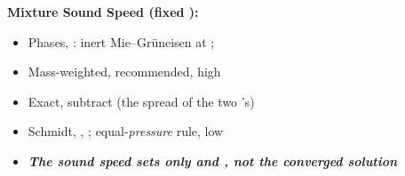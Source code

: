 \documentclass[11pt,addpoints]{exam}
\begin{document}
\clearpage

\begin{tcolorbox}[breakable]
\textbf{Mixture Sound Speed (fixed \bm{$\lambda$}):}\vspace{.5em}
\begin{itemize}
\item Phases, \hspace{3mm} : inert Mie--Gr\"uneisen at ; \hspace{3mm} \vspace{.5em}
\item Mass-weighted, \hspace{3mm}  \hspace{5mm} recommended,  high\vspace{.5em}
\item Exact, \hspace{3mm} subtract  \hspace{5mm} (the spread of the two \bm{$\Gamma$}'s)\vspace{.5em}
\item Schmidt, \hspace{3mm} , ; \hspace{2mm} equal-\emph{pressure} rule,  low\vspace{.5em}
\item \textbf{\emph{The sound speed sets only  and , not the converged solution}}
\end{itemize}
\end{tcolorbox}
\end{document}

